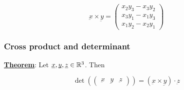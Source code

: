 \documentclass[10pt]{extarticle}
\renewcommand{\vec}[1]{\underbar{\ensuremath{#1}}}
\begin{document}
$$
    \vec{x} \times \vec{y} = \begin{pmatrix}
        x_2 y_3 - x_3 y_2 \\
        x_3 y_1 - x_1 y_3 \\
        x_1 y_2 - x_2 y_1
    \end{pmatrix}
$$

\subsubsection{Cross product and determinant}

\textbf{\underline{Theorem}}: Let $\vec{x}, \vec{y}, \vec{z} \in \R^3$. Then

$$
    \det \left( \begin{pmatrix}
            \vec{x} & \vec{y} & \vec{z}
        \end{pmatrix} \right) = (\vec{x} \times \vec{y}) \cdot \vec{z}
$$
\end{document}
